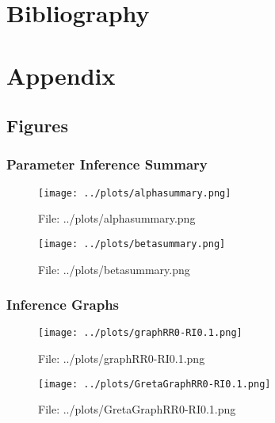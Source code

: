 \documentclass[a4paper, 11pt]{report}
\let\Oldsection\section
\renewcommand{\section}{\FloatBarrier\Oldsection}
\let\Oldsubsection\subsection
\renewcommand{\subsection}{\FloatBarrier\Oldsubsection}
\begin{document}
\chapter{Bibliography}
\printbibliography

\chapter{Appendix}
\section{Figures}\label{append:fig}

\subsection{Parameter Inference Summary}
\begin{figure}[h!] \caption{File: ../plots/alphasummary.png} \texttt{[image: ../plots/alphasummary.png]} \end{figure}
\begin{figure}[h!] \caption{File: ../plots/betasummary.png} \texttt{[image: ../plots/betasummary.png]} \end{figure}

\subsection{Inference Graphs}
\begin{figure}[h!] \caption{File: ../plots/graphRR0-RI0.1.png} \texttt{[image: ../plots/graphRR0-RI0.1.png]} \end{figure}
\begin{figure}[h!] \caption{File: ../plots/GretaGraphRR0-RI0.1.png} \texttt{[image: ../plots/GretaGraphRR0-RI0.1.png]} \end{figure}
\end{document}
